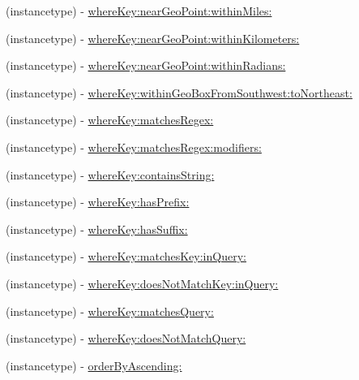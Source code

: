 \begin{DoxyCompactItemize}
\begin{DoxyCompactList}
 \end{DoxyCompactList}\item 
(instancetype) -\/ \hyperlink{class_p_f_query_a54265e0516edcaec3e9c8b2a6b64e475}{where\+Key\+:near\+Geo\+Point\+:within\+Miles\+:}
\item 
(instancetype) -\/ \hyperlink{class_p_f_query_adc0d2ec33e60451b3f25a2a6adf2f841}{where\+Key\+:near\+Geo\+Point\+:within\+Kilometers\+:}
\item 
(instancetype) -\/ \hyperlink{class_p_f_query_a5f3111028461ed003263b2501587e99c}{where\+Key\+:near\+Geo\+Point\+:within\+Radians\+:}
\item 
(instancetype) -\/ \hyperlink{class_p_f_query_a9c93a442a25e1eef0ab3e0a2f6a2c2c4}{where\+Key\+:within\+Geo\+Box\+From\+Southwest\+:to\+Northeast\+:}
\item 
(instancetype) -\/ \hyperlink{class_p_f_query_ae97237da88dc4983ed4d9742670a766c}{where\+Key\+:matches\+Regex\+:}
\begin{DoxyCompactList}\small\item\em 

 \end{DoxyCompactList}\item 
(instancetype) -\/ \hyperlink{class_p_f_query_a1f77ed553ca655f6f08a96333996792e}{where\+Key\+:matches\+Regex\+:modifiers\+:}
\item 
(instancetype) -\/ \hyperlink{class_p_f_query_a6217a6e77b80bf291e04a0595654197d}{where\+Key\+:contains\+String\+:}
\item 
(instancetype) -\/ \hyperlink{class_p_f_query_abb52d63e1457f14e11e83708c0de1ea3}{where\+Key\+:has\+Prefix\+:}
\item 
(instancetype) -\/ \hyperlink{class_p_f_query_a04cde5435989ffddeb1f1c972cfccc45}{where\+Key\+:has\+Suffix\+:}
\item 
(instancetype) -\/ \hyperlink{class_p_f_query_a2d326dd2c4b51b51584639bad2011ddb}{where\+Key\+:matches\+Key\+:in\+Query\+:}
\item 
(instancetype) -\/ \hyperlink{class_p_f_query_ac23f13daa66a5a5184701f65c80bb580}{where\+Key\+:does\+Not\+Match\+Key\+:in\+Query\+:}
\item 
(instancetype) -\/ \hyperlink{class_p_f_query_a3ddddf33aa0ba61381fcb639732ba12c}{where\+Key\+:matches\+Query\+:}
\item 
(instancetype) -\/ \hyperlink{class_p_f_query_a89869b9919022efec5fcce25b686a6f0}{where\+Key\+:does\+Not\+Match\+Query\+:}
\item 
(instancetype) -\/ \hyperlink{class_p_f_query_a5dbb9ee5c793aead5bae8d13d9d5f887}{order\+By\+Ascending\+:}
\begin{DoxyCompactList}\small\item\em 


\end{DoxyCompactList}
\end{DoxyCompactItemize}
